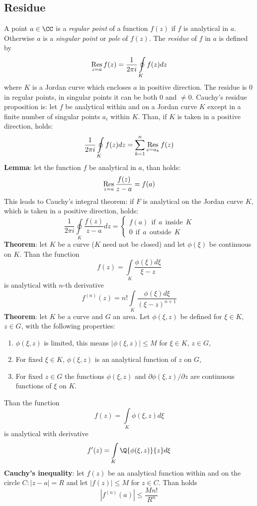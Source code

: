 \subsection{Residue}
A point $a\in\CC$ is a {\it regular point} of a function $f(z)$ if $f$ is
analytical in $a$. Otherwise $a$ is a {\it singular point} or {\it pole} of
$f(z)$. The {\it residue} of $f$ in $a$ is defined by
\[
\mathop{\rm Res}\limits_{z=a}f(z)=\frac{1}{2\pi i}\oint\limits_Kf(z)dz
\]
where $K$ is a Jordan curve which encloses $a$ in positive direction. The
residue is 0 in regular points, in singular points it can be both 0 and $\neq0$.
Cauchy's residue proposition is: let $f$ be analytical within and on a Jordan
curve $K$ except in a finite number of singular points $a_i$ within $K$. Than,
if $K$ is taken in a positive direction, holds:
\[
\frac{1}{2\pi i}\oint\limits_Kf(z)dz=\sum_{k=1}^n\mathop{\rm Res}\limits_{z=a_k}f(z)
\]
{\bf Lemma}: let the function $f$ be analytical in $a$, than holds:
\[
\mathop{\rm Res}\limits_{z=a}\frac{f(z)}{z-a}=f(a)
\]
This leads to Cauchy's integral theorem: if $F$ is analytical on the Jordan
curve $K$, which is taken in a positive direction, holds:
\[
\frac{1}{2\pi i}\oint\limits_K\frac{f(z)}{z-a}dz=\left\{\begin{array}{l}
f(a)~~\mbox{if}~~a~~\mbox{inside}~~K\\
0~~\mbox{if}~~a~~\mbox{outside}~~K
\end{array}\right.
\]
{\bf Theorem}: let $K$ be a curve ($K$ need not be closed) and let
$\phi(\xi)$ be continuous on $K$. Than the function
\[
f(z)=\int\limits_K\frac{\phi(\xi)d\xi}{\xi-z}
\]
is analytical with $n$-th derivative
\[
f^{(n)}(z)=n!\int\limits_K\frac{\phi(\xi)d\xi}{(\xi-z)^{n+1}}
\]
{\bf Theorem}: let $K$ be a curve and $G$ an area. Let $\phi(\xi,z)$ be
defined for $\xi\in K$, $z\in G$, with the following properties:
\begin{enumerate}
\item $\phi(\xi,z)$ is limited, this means $|\phi(\xi,z)|\leq M$ for $\xi\in K$, $z\in G$,
\item For fixed $\xi\in K$, $\phi(\xi,z)$ is an analytical function of $z$ on $G$,
\item For fixed $z\in G$ the functions $\phi(\xi,z)$ and $\partial\phi(\xi,z)/\partial z$
      are continuous functions of $\xi$ on $K$.
\end{enumerate}
Than the function
\[
f(z)=\int\limits_K\phi(\xi,z)d\xi
\]
is analytical with derivative
\[
f'(z)=\int\limits_K\Q{\phi(\xi,z)}{z}d\xi
\]
{\bf Cauchy's inequality}: let $f(z)$ be an analytical function within and on
the circle $C:|z-a|=R$ and let $|f(z)|\leq M$ for $z\in C$. Than holds
\[
\left|f^{(n)}(a)\right|\leq\frac{Mn!}{R^n}
\]

